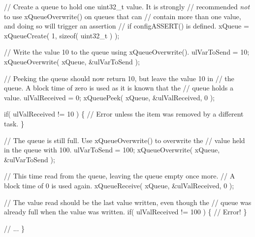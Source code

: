 \begin{DoxyPre}    // Create a queue to hold one uint32\_t value.  It is strongly
    // recommended {\itshape not} to use xQueueOverwrite() on queues that can
    // contain more than one value, and doing so will trigger an assertion
    // if configASSERT() is defined.
    xQueue = xQueueCreate( 1, sizeof( uint32\_t ) );\end{DoxyPre}



\begin{DoxyPre}    // Write the value 10 to the queue using xQueueOverwrite().
    ulVarToSend = 10;
    xQueueOverwrite( xQueue, &ulVarToSend );\end{DoxyPre}



\begin{DoxyPre}    // Peeking the queue should now return 10, but leave the value 10 in
    // the queue.  A block time of zero is used as it is known that the
    // queue holds a value.
    ulValReceived = 0;
    xQueuePeek( xQueue, &ulValReceived, 0 );\end{DoxyPre}



\begin{DoxyPre}    if( ulValReceived != 10 )
    \{
        // Error unless the item was removed by a different task.
    \}\end{DoxyPre}



\begin{DoxyPre}    // The queue is still full.  Use xQueueOverwrite() to overwrite the
    // value held in the queue with 100.
    ulVarToSend = 100;
    xQueueOverwrite( xQueue, &ulVarToSend );\end{DoxyPre}



\begin{DoxyPre}    // This time read from the queue, leaving the queue empty once more.
    // A block time of 0 is used again.
    xQueueReceive( xQueue, &ulValReceived, 0 );\end{DoxyPre}



\begin{DoxyPre}    // The value read should be the last value written, even though the
    // queue was already full when the value was written.
    if( ulValReceived != 100 )
    \{
        // Error!
    \}\end{DoxyPre}



\begin{DoxyPre}    // ...
\}
 \end{DoxyPre}
 